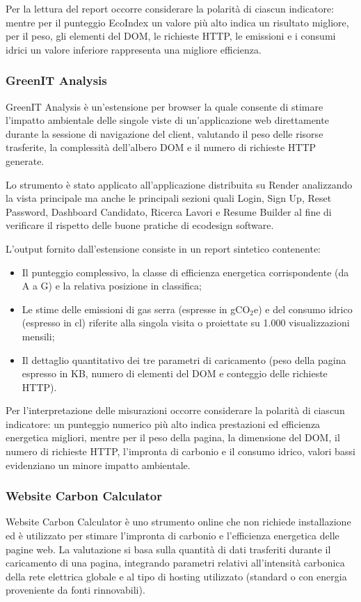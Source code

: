 \documentclass[12pt,a4paper]{article}
\begin{document}
    Per la lettura del report occorre considerare la polarità di ciascun indicatore: mentre per il punteggio EcoIndex
    un valore più alto indica un risultato migliore, per il peso, gli elementi del DOM, le richieste HTTP, le emissioni
    e i consumi idrici un valore inferiore rappresenta una migliore efficienza.

    \subsubsection{GreenIT Analysis}
    GreenIT Analysis è un'estensione per browser la quale consente di stimare l'impatto ambientale delle singole viste
    di un'applicazione web direttamente durante la sessione di navigazione del client, valutando il peso delle risorse
    trasferite, la complessità dell'albero DOM e il numero di richieste HTTP generate.

    Lo strumento è stato applicato all'applicazione distribuita su Render analizzando la vista principale ma anche
    le principali sezioni quali Login, Sign Up, Reset Password, Dashboard Candidato, Ricerca Lavori e Resume Builder
    al fine di verificare il rispetto delle buone pratiche di ecodesign software.

    L'output fornito dall'estensione consiste in un report sintetico contenente:
    \begin{itemize}
        \item Il punteggio complessivo, la classe di efficienza energetica corrispondente (da A a G) e la relativa posizione in classifica;
        \item Le stime delle emissioni di gas serra (espresse in gCO$_2$e) e del consumo idrico (espresso in cl) riferite alla singola visita o proiettate su 1.000 visualizzazioni mensili;
        \item Il dettaglio quantitativo dei tre parametri di caricamento (peso della pagina espresso in KB, numero di elementi del DOM e conteggio delle richieste HTTP).
    \end{itemize}

    Per l'interpretazione delle misurazioni occorre considerare la polarità di ciascun indicatore: un punteggio
    numerico più alto indica prestazioni ed efficienza energetica migliori, mentre per il peso della pagina,
    la dimensione del DOM, il numero di richieste HTTP, l'impronta di carbonio e il consumo idrico, valori bassi
    evidenziano un minore impatto ambientale.

    \subsubsection{Website Carbon Calculator}
    Website Carbon Calculator è uno strumento online che non richiede installazione ed è utilizzato per stimare
    l'impronta di carbonio e l'efficienza energetica delle pagine web. La valutazione si basa sulla quantità di
    dati trasferiti durante il caricamento di una pagina, integrando parametri relativi all'intensità carbonica
    della rete elettrica globale e al tipo di hosting utilizzato (standard o con energia proveniente da fonti
    rinnovabili).
\end{document}
